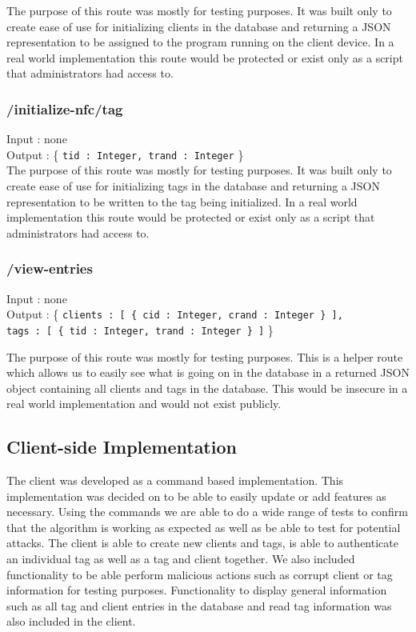 The purpose of this route was mostly for testing purposes. It was built only to create ease of use for initializing clients in the database and returning a JSON representation to be assigned to the program running on the client device. In a real world implementation this route would be protected or exist only as a script that administrators had access to.
 
\subsubsection{/initialize-nfc/tag}
 
Input : none\\
Output : \{ \verb|tid : Integer, trand : Integer| \}\\
 
The purpose of this route was mostly for testing purposes. It was built only to create ease of use for initializing tags in the database and returning a JSON representation to be written to the tag being initialized. In a real world implementation this route would be protected or exist only as a script that administrators had access to.
 
\subsubsection{/view-entries}
 
\begin{tabbing}
    Input : none\\
    Output : \{ \=\verb|clients : [ { cid : Integer, crand : Integer } ], |\\
            \>\verb|tags : [ { tid : Integer, trand : Integer } ]| \}\\
\end{tabbing}
 
The purpose of this route was mostly for testing purposes. This is a helper route which allows us to easily see what is going on in the database in a returned JSON object containing all clients and tags in the database. This would be insecure in a real world implementation and would not exist publicly.

\subsection{Client-side Implementation}
\label{client-side-imp}
The client was developed as a command based implementation. This implementation was decided on to be able to easily update or add features as necessary. Using the commands we are able to do a wide range of tests to confirm that the algorithm is working as expected as well as be able to test for potential attacks. The client is able to create new clients and tags, is able to authenticate an individual tag as well as a tag and client together. We also included functionality to be able perform malicious actions such as corrupt client or tag information for testing purposes. Functionality to display general information such as all tag and client entries in the database and read tag information was also included in the client.\\

